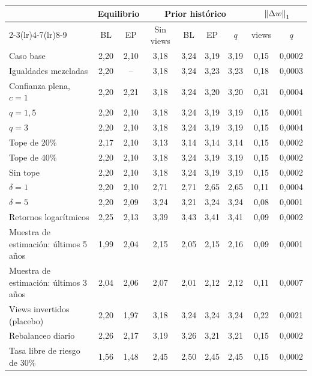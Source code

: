 \begin{tabular}{lcccccccc}
\toprule
 & \multicolumn{2}{c}{Equilibrio} & \multicolumn{4}{c}{Prior hist\'orico} & \multicolumn{2}{c}{$\left\lVert \Delta w \right\rVert_1$} \\
\cmidrule(lr){2-3}\cmidrule(lr){4-7}\cmidrule(lr){8-9}
 & BL & EP & Sin views & BL & EP & $q$ & views & $q$ \\
\midrule
Caso base & 2{,}20 & 2{,}10 & 3{,}18 & 3{,}24 & 3{,}19 & 3{,}19 & 0{,}15 & 0{,}0002 \\
Igualdades mezcladas & 2{,}20 & -- & 3{,}18 & 3{,}24 & 3{,}23 & 3{,}23 & 0{,}18 & 0{,}0003 \\
Confianza plena, $c=1$ & 2{,}20 & 2{,}21 & 3{,}18 & 3{,}24 & 3{,}20 & 3{,}20 & 0{,}31 & 0{,}0004 \\
$q = 1{,}5$ & 2{,}20 & 2{,}10 & 3{,}18 & 3{,}24 & 3{,}19 & 3{,}19 & 0{,}15 & 0{,}0001 \\
$q = 3$ & 2{,}20 & 2{,}10 & 3{,}18 & 3{,}24 & 3{,}19 & 3{,}19 & 0{,}15 & 0{,}0004 \\
Tope de 20\% & 2{,}17 & 2{,}10 & 3{,}13 & 3{,}14 & 3{,}14 & 3{,}14 & 0{,}15 & 0{,}0002 \\
Tope de 40\% & 2{,}20 & 2{,}10 & 3{,}18 & 3{,}24 & 3{,}19 & 3{,}19 & 0{,}15 & 0{,}0002 \\
Sin tope & 2{,}20 & 2{,}10 & 3{,}18 & 3{,}24 & 3{,}19 & 3{,}19 & 0{,}15 & 0{,}0002 \\
$\delta = 1$ & 2{,}20 & 2{,}10 & 2{,}71 & 2{,}71 & 2{,}65 & 2{,}65 & 0{,}11 & 0{,}0004 \\
$\delta = 5$ & 2{,}20 & 2{,}09 & 3{,}24 & 3{,}21 & 3{,}24 & 3{,}24 & 0{,}08 & 0{,}0001 \\
Retornos logar\'itmicos & 2{,}25 & 2{,}13 & 3{,}39 & 3{,}43 & 3{,}41 & 3{,}41 & 0{,}09 & 0{,}0002 \\
Muestra de estimaci\'on: \'ultimos 5 a\~nos & 1{,}99 & 2{,}04 & 2{,}15 & 2{,}05 & 2{,}15 & 2{,}16 & 0{,}09 & 0{,}0001 \\
Muestra de estimaci\'on: \'ultimos 3 a\~nos & 2{,}04 & 2{,}06 & 2{,}07 & 2{,}01 & 2{,}12 & 2{,}12 & 0{,}11 & 0{,}0007 \\
Views invertidos (placebo) & 2{,}20 & 1{,}97 & 3{,}18 & 3{,}24 & 3{,}24 & 3{,}24 & 0{,}22 & 0{,}0021 \\
Rebalanceo diario & 2{,}26 & 2{,}17 & 3{,}19 & 3{,}26 & 3{,}21 & 3{,}21 & 0{,}15 & 0{,}0002 \\
Tasa libre de riesgo de 30\% & 1{,}56 & 1{,}48 & 2{,}45 & 2{,}50 & 2{,}45 & 2{,}45 & 0{,}15 & 0{,}0002 \\
\bottomrule
\end{tabular}
